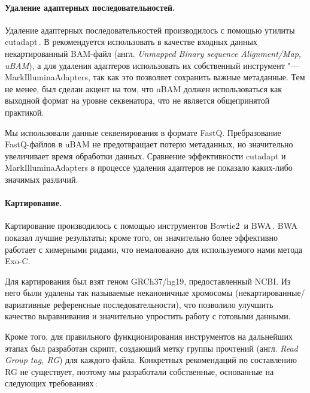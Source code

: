 \documentclass[a4paper,14pt]{extarticle}
\newcommand{\utilname}[1]{\textenglish{#1}}
\newcommand{\ecitep}[1]{\textenglish{\citep{#1}}}
\newcommand{\engterm}[1]{англ. \textenglish{\textit{#1}}}
\begin{document}
\paragraph{Удаление адаптерных последовательностей.}
Удаление адаптерных последовательностей производилось с помощью утилиты \utilname{cutadapt}\,\ecitep{Martin_2011}.
В \citet{Auwera_2013} рекомендуется использовать в качестве входных данных некартированный BAM-файл (\engterm{Unmapped Binary sequence Alignment/Map, uBAM}), а для удаления адаптеров использовать их собственный инструмент "--- \utilname{MarkIlluminaAdapters}, так как это позволяет сохранить важные метаданные.
Тем не менее, был сделан акцент на том, что uBAM должен использоваться как выходной формат на уровне секвенатора, что не является общепринятой практикой.

Мы использовали данные секвенирования в формате FastQ.
Пребразование FastQ-файлов в uBAM не предотвращает потерю метаданных, но значительно увеличивает время обработки данных.
Сравнение эффективности \utilname{cutadapt} и \utilname{MarkIlluminaAdapters} в процессе удаления адаптеров не показало каких-либо значимых различий.

\paragraph{Картирование.}
Картирование производилось с помощью инструментов \utilname{Bow\-tie2}\,\ecitep{Langmead_2012} и \utilname{BWA}\,\ecitep{Li_2009}.
\utilname{BWA} показал лучшие результаты;
кроме того, он значительно более эффективно работает с химерными ридами, что немаловажно для используемого нами метода Exo-C.

Для картирования был взят геном GRCh37/hg19, предоставленный NCBI.
Из него были удалены так называемые неканоничные хромосомы (некартированные/вариативные референсные последовательности), что позволило улучшить качество выравнивания и значительно упростить работу с готовыми данными.

Кроме того, для правильного функционирования инструментов на дальнейших этапах был разработан скрипт, создающий метку группы прочтений (\engterm{Read Group tag, RG}) для каждого файла.
Конкретных рекомендаций по составлению RG не существует, поэтому мы разработали собственные, основанные на следующих требованиях\,\ecitep{Auwera_2013}:
\end{document}
